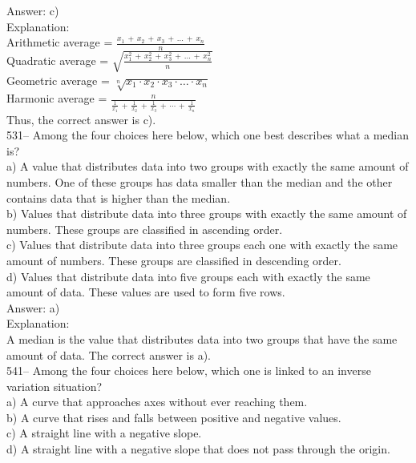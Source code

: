 \documentclass[letterpaper, 12pt]{article}
\begin{document}
Answer: c)\\

Explanation: \\
Arithmetic average =
$\frac{x_1\,+\,x_2\,+\,x_3\,+\,\ldots\,+\,x_n}{n}$\\[2mm]
Quadratic average =
$\sqrt{\frac{x_1^{2}\,+\,x_2^{2}\,+\,x_3^{2}\,+\,\ldots\,+\,x_n^{2}}{n}}$\\[2mm]
Geometric average = $\sqrt[n]{x_1\cdot x_2\cdot x_3 \cdot \ldots \cdot
x_n}$\\[2mm]
Harmonic average =
$\frac{n}{\frac{1}{x_1}\,+\,\frac{1}{x_2}\,+\,\frac{1}{x_3}\,+\,\cdots\,+\,\frac{1}{x_n}}$\\[2mm]
Thus, the correct answer is c).\\



531-- Among the four choices here below, which one best describes what a median is?\\

a) A value that distributes data into two groups with exactly the same amount of numbers.
One of these groups has data smaller than the median and the other contains data that is higher than the median.\\
b) Values that distribute data into three groups with exactly the same amount of numbers.
These groups are classified in ascending order.\\
c) Values that distribute data into three groups each one with exactly the same amount of numbers.
These groups are classified in descending order.\\
d) Values that distribute data into five groups each with exactly the same amount of data.
These values are used to form five rows.\\

Answer: a) \\

Explanation: \\
A median is the value that distributes data into two groups that have the same amount of data.
The correct answer is a).\\



541-- Among the four choices here below, which one is linked to an inverse variation situation?\\

a) A curve that approaches axes without ever reaching them.\\
b) A curve that rises and falls between positive and negative values.\\
c) A straight line with a negative slope.\\
d) A straight line with a negative slope that does not pass through the origin.\\
\end{document}
